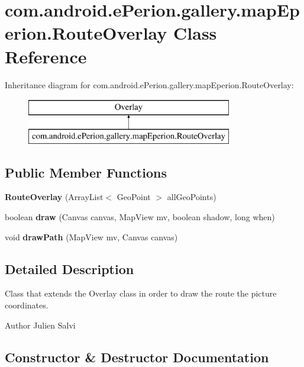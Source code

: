 \section{com.\-android.\-e\-Perion.\-gallery.\-map\-Eperion.\-Route\-Overlay Class Reference}
\label{classcom_1_1android_1_1e_perion_1_1gallery_1_1map_eperion_1_1_route_overlay}
Inheritance diagram for com.\-android.\-e\-Perion.\-gallery.\-map\-Eperion.\-Route\-Overlay\-:\begin{figure}[H]
\begin{center}
\leavevmode
\includegraphics[height=2.000000cm]{classcom_1_1android_1_1e_perion_1_1gallery_1_1map_eperion_1_1_route_overlay}
\end{center}
\end{figure}
\subsection*{Public Member Functions}
\begin{DoxyCompactItemize}
\item 
{\bf Route\-Overlay} (Array\-List$<$ Geo\-Point $>$ all\-Geo\-Points)
\item 
boolean {\bfseries draw} (Canvas canvas, Map\-View mv, boolean shadow, long when)\label{classcom_1_1android_1_1e_perion_1_1gallery_1_1map_eperion_1_1_route_overlay_aac83dec4f9193bf05c66d2d2556ac816}

\item 
void {\bf draw\-Path} (Map\-View mv, Canvas canvas)
\end{DoxyCompactItemize}


\subsection{Detailed Description}
Class that extends the Overlay class in order to draw the route the picture coordinates. \begin{DoxyAuthor}{Author}
Julien Salvi 
\end{DoxyAuthor}


\subsection{Constructor \& Destructor Documentation}
